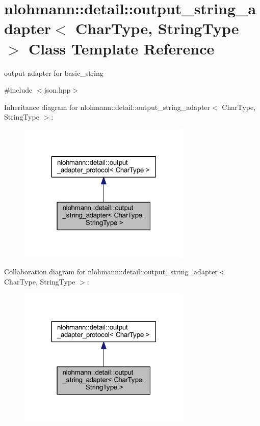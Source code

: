 \hypertarget{classnlohmann_1_1detail_1_1output__string__adapter}{}\section{nlohmann\+::detail\+::output\+\_\+string\+\_\+adapter$<$ Char\+Type, String\+Type $>$ Class Template Reference}
\label{classnlohmann_1_1detail_1_1output__string__adapter}


output adapter for basic\+\_\+string  




{\ttfamily \#include $<$json.\+hpp$>$}



Inheritance diagram for nlohmann\+::detail\+::output\+\_\+string\+\_\+adapter$<$ Char\+Type, String\+Type $>$\+:
\nopagebreak
\begin{figure}[H]
\begin{center}
\leavevmode
\includegraphics[width=233pt]{classnlohmann_1_1detail_1_1output__string__adapter__inherit__graph}
\end{center}
\end{figure}


Collaboration diagram for nlohmann\+::detail\+::output\+\_\+string\+\_\+adapter$<$ Char\+Type, String\+Type $>$\+:
\nopagebreak
\begin{figure}[H]
\begin{center}
\leavevmode
\includegraphics[width=233pt]{classnlohmann_1_1detail_1_1output__string__adapter__coll__graph}
\end{center}
\end{figure}
